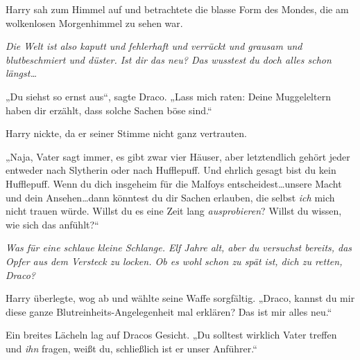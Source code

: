 Harry sah zum Himmel auf und betrachtete die blasse Form des Mondes, die am wolkenlosen Morgenhimmel zu sehen war.

\emph{Die Welt ist also kaputt und fehlerhaft und verrückt und grausam und blutbeschmiert und düster. Ist dir das neu? Das wusstest du doch alles schon längst…}

„Du siehst so ernst aus“, sagte Draco. „Lass mich raten: Deine Muggeleltern haben dir erzählt, dass solche Sachen böse sind.“

Harry nickte, da er seiner Stimme nicht ganz vertrauten.

„Naja, Vater sagt immer, es gibt zwar vier Häuser, aber letztendlich gehört jeder entweder nach Slytherin oder nach Hufflepuff. Und ehrlich gesagt bist du kein Hufflepuff. Wenn du dich insgeheim für die Malfoys entscheidest…unsere Macht und dein Ansehen…dann könntest du dir Sachen erlauben, die selbst \emph{ich} mich nicht trauen würde. Willst du es eine Zeit lang \emph{ausprobieren}? Willst du wissen, wie sich das anfühlt?“

\emph{Was für eine schlaue kleine Schlange. Elf Jahre alt, aber du versuchst bereits, das Opfer aus dem Versteck zu locken. Ob es wohl schon zu spät ist, dich zu retten, Draco?}

Harry überlegte, wog ab und wählte seine Waffe sorgfältig. „Draco, kannst du mir diese ganze Blutreinheits-Angelegenheit mal erklären? Das ist mir alles neu.“

Ein breites Lächeln lag auf Dracos Gesicht. „Du solltest wirklich Vater treffen und \emph{ihn} fragen, weißt du, schließlich ist er unser Anführer.“

